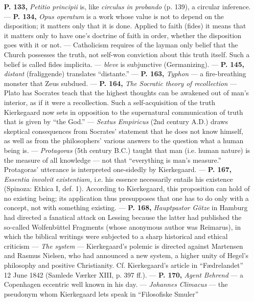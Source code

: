 \documentclass[12pt,a4paper,openany]{book}
\newcommand{\opage}[1]{\marginnote{\footnotesize\textit{[#1]}}}
\begin{document}
\textbf{P. 133,} \textit{Petitio principii} is, like \textit{circulus in probando} (p. 139), a
circular inference. --- \textbf{P. 134,} \textit{Opus operatum} is a work whose value is not
to depend on the disposition; it matters only that it is done. Applied
to faith (fides) it means that it matters only to have one's doctrine of faith
in order, whether the disposition goes with it or not. --- Catholicism
requires of the layman only belief that the Church possesses the truth, not
self-won conviction about this truth itself. Such a belief is called
fides implicita. --- \textit{bleve} is subjunctive (Germanizing). --- \textbf{P. 145,} \textit{distant} (fraliggende)
translates ``distante.'' --- \textbf{P. 163,} \textit{Typhon} --- a fire-breathing monster that
Zeus subdued. --- \textbf{P. 164,} \textit{The Socratic theory of recollection} --- Plato
has Socrates teach that the highest thoughts can be awakened out of man's
interior, as if it were a recollection. Such a self-acquisition of the truth
Kierkegaard now sets in opposition to the supernatural communication of truth
that is given by ``the God.'' --- \textit{Sextus Empiricus} (2nd century A.D.) draws skeptical
consequences from Socrates' statement that he does not know himself, as well
as from the philosophers' various answers to the question what a
human being is. --- \textit{Protagoras} (5th century B.C.) taught that man (i.e.
human nature) is the measure of all knowledge --- not that
``everything is man's measure.'' Protagoras' utterance is interpreted one-sidedly by Kierkegaard.
--- \textbf{P. 167,} \textit{Essentia involvit existentiam,} i.e. his essence necessarily
entails his existence (Spinoza: Ethica I, def. 1). According to Kierkegaard,
this proposition can hold of no existing being; its
application thus presupposes that one has to do only with a concept, not with
something existing. --- \textbf{P. 168,} \textit{Hauptpastor Götze} in Hamburg had
directed a fanatical attack on Lessing because the latter had published the so-called
Wolfenbüttel Fragments (whose anonymous author was Reimarus), in
\setcounter{footnote}{0}%
\opage{304}which the biblical writings were subjected to a sharp historical and ethical
criticism --- \textit{The system} --- Kierkegaard's polemic is directed against Martensen and
Rasmus Nielsen, who had announced a new system, a higher unity of
Hegel's philosophy and positive Christianity. Cf. Kierkegaard's article in ``Fædrelandet''
12 June 1842 (Samlede Værker XIII, p. 397 ff.). --- \textbf{P. 170,} \textit{Agent
Behrend} --- a Copenhagen eccentric well known in his day. --- \textit{Johannes
Climacus} --- the pseudonym whom Kierkegaard lets speak in ``Filosofiske Smuler''
\end{document}
